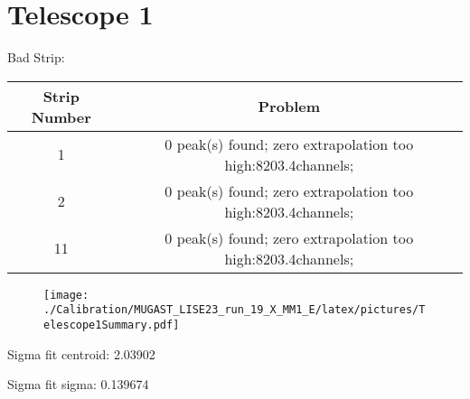 \documentclass[a4paper,6pt]{article}
\begin{document}
\section{Telescope 1 }
 Bad Strip:
\begin{center}
\begin{tabular}{ | c | c | } 
\hline 
 Strip Number & Problem \\ \hline 
1 &  0 peak(s) found; zero extrapolation too high:8203.4channels;  \\ \hline 
2 &  0 peak(s) found; zero extrapolation too high:8203.4channels;  \\ \hline 
11 &  0 peak(s) found; zero extrapolation too high:8203.4channels;  \\ \hline 
\end{tabular} 
\end{center}
\begin{figure}[htcb!]
\begin{center}
\texttt{[image: ./Calibration/MUGAST\_LISE23\_run\_19\_X\_MM1\_E/latex/pictures/Telescope1Summary.pdf]}
\end{center}
\end{figure}
\pagebreak
Sigma fit centroid: 2.03902

Sigma fit sigma: 0.139674
\end{document}
